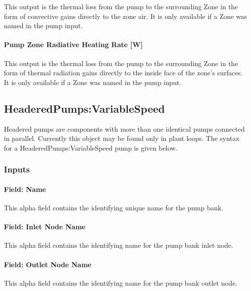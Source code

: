 This output is the thermal loss from the pump to the surrounding Zone in the form of convective gains directly to the zone air. It is only available if a Zone was named in the pump input.

\paragraph{Pump Zone Radiative Heating Rate {[}W{]}}\label{pump-zone-radiative-heating-rate-w-3}

This output is the thermal loss from the pump to the surrounding Zone in the form of thermal radiation gains directly to the inside face of the zone's surfaces. It is only available if a Zone was named in the pump input.

\subsection{HeaderedPumps:VariableSpeed}\label{headeredpumpsvariablespeed}

Headered pumps are components with more than one identical pumps connected in parallel. Currently this object may be found only in plant loops. The syntax for a HeaderedPumps:VariableSpeed pump is given below.

\subsubsection{Inputs}\label{inputs-4-024}

\paragraph{Field: Name}\label{field-name-4-021}

This alpha field contains the identifying unique name for the pump bank.

\paragraph{Field: Inlet Node Name}\label{field-inlet-node-name-4}

This alpha field contains the identifying name for the pump bank inlet node.

\paragraph{Field: Outlet Node Name}\label{field-outlet-node-name-4}

This alpha field contains the identifying name for the pump bank outlet node.


